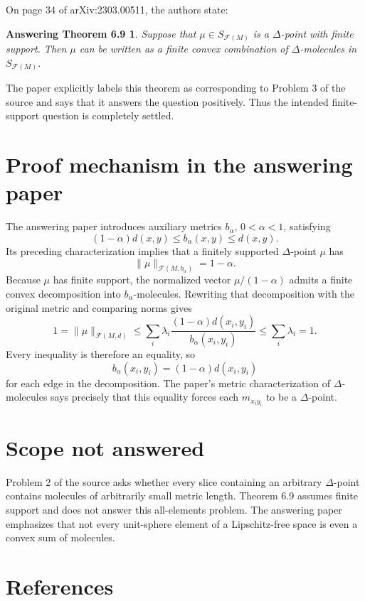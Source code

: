 \documentclass[11pt]{article}
\newtheorem*{answertheorem}{Answering Theorem 6.9}
\newcommand{\F}{\mathcal F}
\begin{document}
On page 34 of arXiv:2303.00511, the authors state:

\begin{answertheorem}
Suppose that \(\mu\in S_{\F(M)}\) is a \(\Delta\)-point with finite support.
Then \(\mu\) can be written as a finite convex combination of
\(\Delta\)-molecules in \(S_{\F(M)}\).
\end{answertheorem}

The paper explicitly labels this theorem as corresponding to Problem 3 of the
source and says that it answers the question positively.  Thus the intended
finite-support question is completely settled.

\section*{Proof mechanism in the answering paper}

The answering paper introduces auxiliary metrics \(b_\alpha\),
\(0<\alpha<1\), satisfying
\[
 (1-\alpha)d(x,y)\leq b_\alpha(x,y)\leq d(x,y).
\]
Its preceding characterization implies that a finitely supported
\(\Delta\)-point \(\mu\) has
\[
 \|\mu\|_{\F(M,b_\alpha)}=1-\alpha.
\]
Because \(\mu\) has finite support, the normalized vector
\(\mu/(1-\alpha)\) admits a finite convex decomposition into
\(b_\alpha\)-molecules.  Rewriting that decomposition with the original
metric and comparing norms gives
\[
 1=\|\mu\|_{\F(M,d)}
 \leq \sum_i\lambda_i
       \frac{(1-\alpha)d(x_i,y_i)}{b_\alpha(x_i,y_i)}
 \leq \sum_i\lambda_i=1.
\]
Every inequality is therefore an equality, so
\[
 b_\alpha(x_i,y_i)=(1-\alpha)d(x_i,y_i)
\]
for each edge in the decomposition.  The paper's metric characterization of
\(\Delta\)-molecules says precisely that this equality forces each
\(m_{x_i y_i}\) to be a \(\Delta\)-point.

\section*{Scope not answered}

Problem 2 of the source asks whether every slice containing an arbitrary
\(\Delta\)-point contains molecules of arbitrarily small metric length.
Theorem 6.9 assumes finite support and does not answer this all-elements
problem.  The answering paper emphasizes that not every unit-sphere element
of a Lipschitz-free space is even a convex sum of molecules.

\section*{References}
\end{document}
